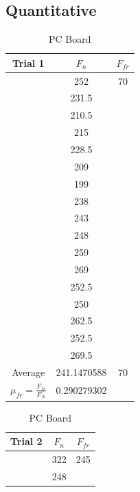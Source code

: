 \documentclass[12pt]{article}
\begin{document}
\subsection{Quantitative}
\begin{table}
    \footnotesize
    \caption{PC Board}
    \begin{tabular} {| c  c  c |}
        \hline
        Trial 1 & $F_{n}$       & $F_{fr}$  \\
        \hline
                & 252           & 70        \\
                & 231.5         &           \\
                & 210.5         &           \\
                & 215           &           \\
                & 228.5         &           \\
                & 209           &           \\
                & 199           &           \\
                & 238           &           \\
                & 243           &           \\
                & 248           &           \\
                & 259           &           \\
                & 269           &           \\
                & 252.5         &           \\
                & 250           &           \\
                & 262.5         &           \\
                & 252.5         &           \\
                & 269.5         &           \\
        \hline
        Average & 241.1470588   & 70        \\
        \hline
        $\mu_{fr} = \frac{F_{fr}}{F_{N}}$ & 0.290279302 & \\
        \hline
    \end{tabular}
    \hfill
    \begin{tabular} {| c  c  c |}
        \hline
        Trial 2 & $F_{n}$       & $F_{fr}$  \\
        \hline
                & 322           & 245       \\
                & 248           &           \\

\end{tabular}
\end{table}
\end{document}
